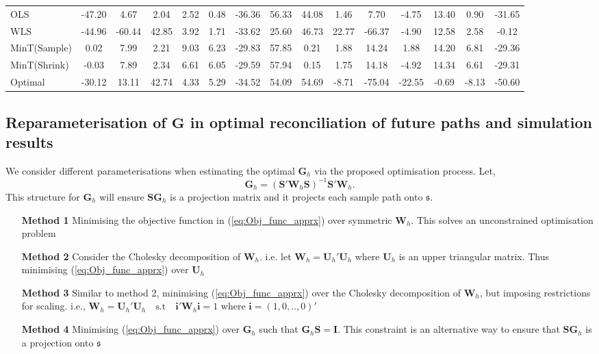 \documentclass[12pt]{article}
\theoremstyle{definition}
\begin{document}
\begin{table}[H]
{\begin{tabular}{lcccccccccccccc}
			OLS & -47.20 & 4.67 & 2.04 & 2.52 & 0.48 & -36.36 & 56.33 & 44.08 & 1.46 & 7.70 & -4.75 & 13.40 & 0.90 & -31.65\\
			WLS & -44.96 & -60.44 & 42.85 & 3.92 & 1.71 & -33.62 & 25.60 & 46.73 & 22.77 & -66.37 & -4.90 & 12.58 & 2.58 & -0.12\\
			MinT(Sample) & 0.02 & 7.99 & 2.21 & 9.03 & 6.23 & -29.83 & 57.85 & 0.21 & 1.88 & 14.24 & 1.88 & 14.20 & 6.81 & -29.36\\
			MinT(Shrink) & -0.03 & 7.89 & 2.34 & 6.61 & 6.05 & -29.59 & 57.94 & 0.15 & 1.75 & 14.18 & -4.92 & 14.34 & 6.61 & -29.31\\
			Optimal & -30.12 & 13.11 & 42.74 & 4.33 & 5.29 & -34.52 & 54.09 & 54.69 & -8.71 & -75.04 & -22.55 & -0.69 & -8.13 & -50.60\\
			\bottomrule
		\end{tabular}
	}
\end{table}

\subsection{Reparameterisation of $\bm{G}$ in optimal reconciliation of future paths and simulation results} \label{app:ReparaG}

We consider different parameterisations when estimating the optimal $\bm{G}_h$ via the proposed optimisation process. Let,
\begin{equation}\label{eq:StructureofG}
\bm{G}_h = (\bm{S'W}_h\bm{S})^{-1}\bm{S'W}_h.
\end{equation}
This structure for $\bm{G}_h$ will ensure $\bm{SG}_h$ is a projection matrix and it projects each sample path onto $\mathfrak{s}$.
\begin{itemize}
	\item[\textbf{Method 1}] Minimising the objective function in (\ref{eq:Obj_func_apprx}) over symmetric $\bm{W}_h$. This solves an unconstrained optimisation problem
	\item[\textbf{Method 2}] Consider the Cholesky decomposition of $\bm{W}_h$. i.e. let $\bm{W}_h = \bm{U}_h'\bm{U}_h$ where $\bm{U}_h$ is an upper triangular matrix. Thus minimising (\ref{eq:Obj_func_apprx}) over $\bm{U}_h$
	\item[\textbf{Method 3}] Similar to method 2, minimising (\ref{eq:Obj_func_apprx}) over the Cholesky decomposition of $\bm{W}_h$, but imposing restrictions for scaling. i.e., $\bm{W}_h=\bm{U}_h'\bm{U}_h \quad \text{s.t} \quad \bm{i'}\bm{W}_h\bm{i}=1$ where $\bm{i}=(1,0,..,0)'$
	\item[\textbf{Method 4}] Minimising (\ref{eq:Obj_func_apprx}) over $\bm{G}_h$ such that $\bm{G}_h\bm{S}=\bm{I}$. This constraint is an alternative way to ensure that $\bm{SG}_h$ is a projection onto $\mathfrak{s}$
	
\end{itemize}
\end{document}
